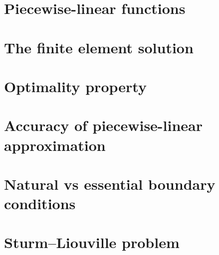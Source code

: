 \section{Piecewise-linear functions}

\section{The finite element solution}

\section{Optimality property}

\section{Accuracy of piecewise-linear approximation}

\section{Natural vs essential boundary conditions}

\section{Sturm--Liouville problem}
